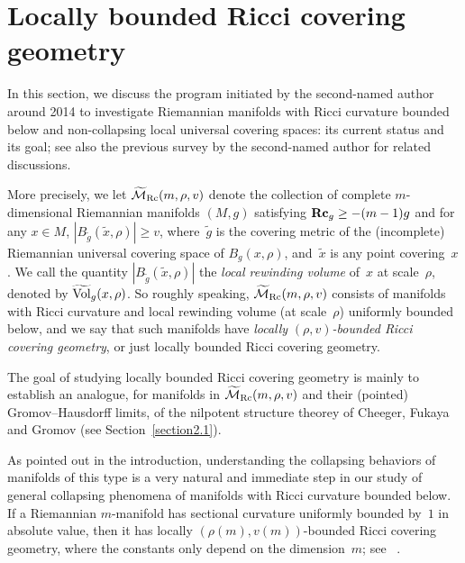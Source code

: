 \documentclass[10pt,a4paper]{amsart}
\numberwithin{equation}{section}
\newcommand{\Rc}{\operatorname{\bf Rc}}
\begin{document}
\section{Locally bounded Ricci covering geometry}\label{section3}
In this section, we discuss the program initiated by the second-named author
around 2014 to investigate Riemannian manifolds with Ricci curvature bounded
below and non-collapsing local universal covering spaces: its current status
and its goal; see also the previous survey \cite{Rong18} by the second-named
author for related discussions.

More precisely, we let $\widetilde{\mathcal{M}}_{\rm Rc}(m,\rho,v)$ denote the
collection of complete $m$-dimensional Riemannian manifolds $(M,g)$ satisfying
$\Rc_g\ge -(m-1)g$ and for any $x\in M$, $|B_{\tilde{g}}(\tilde{x}, \rho)
|\ge v$, where~$\tilde{g}$ is the covering metric of the (incomplete)
Riemannian universal covering space of $B_g(x,\rho)$, and~$\tilde{x}$ is any
point covering~$x$. We call the quantity $|B_{\tilde{g}}(\tilde{x},
\rho)|$ the \emph{local rewinding volume} of~$x$ at scale~$\rho$, denoted
by $\widetilde{\rm Vol}_g(x,\rho)$. So roughly speaking,
$\widetilde{\mathcal{M}}_{\rm Rc}(m,\rho,v)$ consists of manifolds with Ricci
curvature and local rewinding volume (at scale~$\rho$) uniformly bounded below,
and we say that such manifolds have \emph{locally} $(\rho,v)$\emph{-bounded
Ricci covering geometry}, or just locally bounded Ricci covering geometry.

The goal of studying locally bounded Ricci covering geometry is mainly to
establish an analogue, for manifolds in $\widetilde{\mathcal{M}}_{\rm Rc}(m,\rho,v)$
and their (pointed) Gromov--Hausdorff limits, of the nilpotent structure theorey
of Cheeger, Fukaya and Gromov (see Section~\ref{section2.1}).

 As pointed out in the introduction, understanding the collapsing behaviors of
 manifolds of this type is a very natural and immediate step in our study of
 general collapsing phenomena of manifolds with Ricci curvature bounded below.
 If a Riemannian $m$-manifold has sectional curvature uniformly bounded by~$1$
 in absolute value, then it has locally $(\rho(m),v(m))$-bounded Ricci covering
 geometry, where the constants only depend on the dimension~$m$; see~
 \cite{CFG92, Rong20}.
\end{document}
